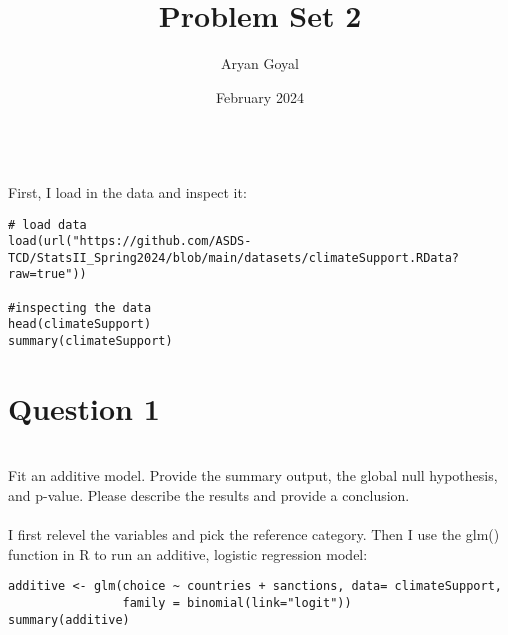 \documentclass{article}
\title{Problem Set 2}
\author{Aryan Goyal}
\date{February 2024}
\begin{document}
\maketitle
\\
First, I load in the data and inspect it:
\begin{verbatim}
# load data
load(url("https://github.com/ASDS-
TCD/StatsII_Spring2024/blob/main/datasets/climateSupport.RData?raw=true"))

#inspecting the data
head(climateSupport)
summary(climateSupport)
\end{verbatim}

\section{Question 1}
\\ Fit an additive model. Provide the summary output, the global null hypothesis, and p-value. Please describe the results and provide a conclusion. 
\\
\\
I first relevel the variables and pick the reference category. Then I use the glm() function in R to run an additive, logistic regression model:
\\
\begin{verbatim}
additive <- glm(choice ~ countries + sanctions, data= climateSupport, 
                family = binomial(link="logit"))
summary(additive)
\end{verbatim}
\end{document}
